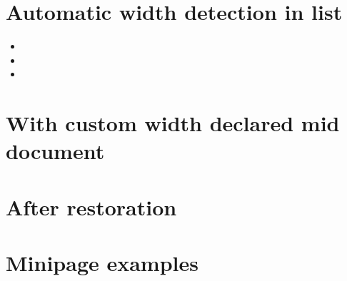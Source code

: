 \documentclass{article}
\begin{document}
\section{Automatic width detection in list}

\lipsum[1][1-3]
\notebox{\the\linewidth\ \the\textwidth\ \the\aweboxlinewidthvar\
  \the\aweboxleftmargin\ \the\aweboxcontentwidth\ \lipsum[1][3-6]}
\lipsum[1][6-9]

\begin{itemize}
\item \lipsum[2][1-3]
\item \lipsum[2][3-6]\notebox{\the\linewidth\ \the\textwidth\
    \the\aweboxlinewidthvar\ \the\aweboxleftmargin\
    \the\aweboxcontentwidth\ \lipsum[2][6-9]}
\item \lipsum[2][9-12]
\end{itemize}

\lipsum[3][1-3]
\notebox{\the\linewidth\ \the\textwidth\ \the\aweboxlinewidthvar\
  \the\aweboxleftmargin\ \the\aweboxcontentwidth\ \lipsum[3][3-6]}
\lipsum[3][6-9]

\section{With custom width declared mid document}

\setlength{\aweboxcontentwidth}{0.4\linewidth}

\lipsum[4][1-3]
\notebox{\the\linewidth\ \the\textwidth\ \the\aweboxlinewidthvar\
  \the\aweboxleftmargin\ \the\aweboxcontentwidth\ \lipsum[4][3-6]}
\lipsum[4][6-9]

\section{After restoration}

\setlength{\aweboxcontentwidth}{0.88\linewidth}

\lipsum[5][1-3]
\notebox{\the\linewidth\ \the\textwidth\ \the\aweboxlinewidthvar\
  \the\aweboxleftmargin\ \the\aweboxcontentwidth\ \lipsum[5][3-6]}
\lipsum[5][6-9]

\section{Minipage examples}

\fbox{
  \begin{minipage}{0.4\linewidth}
    \lipsum[1][1]
    \notebox{\the\linewidth\ \the\textwidth\ \the\aweboxlinewidthvar\
      \the\aweboxleftmargin\ \the\aweboxcontentwidth\ \lipsum[1][3]}
  \end{minipage}}
\end{document}

